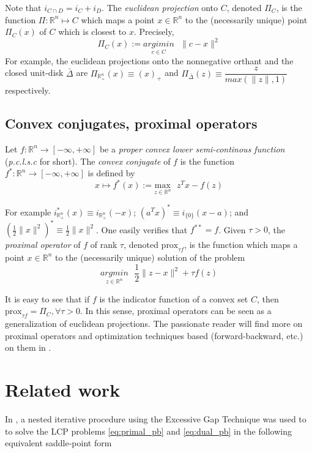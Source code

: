 \documentclass{article} %
\begin{document}
Note that $i_{C \cap D} = i_C + i_D$. The \textit{euclidean projection} onto $C$, denoted $\Pi_C$, is the function
$\Pi: \mathbb{R}^n \mapsto C$ which maps a point $x \in \mathbb{R}^n$ to the (necessarily unique) point $\Pi_C(x)$ of $C$ which is closest to $x$. Precisely,
\begin{equation}
  \Pi_C(x) := \underset{c \in C}{argimin}\text{ }\|c - x\|^2
\end{equation}
For example, the euclidean projections onto the nonnegative orthant and the closed unit-disk $\bar{\Delta}$
are $\Pi_{\mathbb{R}^n_+}(x) \equiv (x)_+$ and $\Pi_{\bar{\Delta}}(z) \equiv \dfrac{z}{max(\|z\|, 1)}$ respectively.

\subsection{Convex conjugates, proximal operators}
Let $f : \mathbb{R}^n \rightarrow [-\infty, +\infty]$ be a \textit{proper convex lower semi-continous function}
(\textit{p.c.l.s.c} for short). The \textit{convex conjugate} of $f$ is the function $f^*: \mathbb{R}^n \rightarrow [-\infty, +\infty]$ is defined by
\begin{equation}
  x \mapsto f^*(x) := \underset{z \in \mathbb{R}^n}{\text{max}}\text{ }z^Tx - f(z)
\end{equation}

For example $i_{\mathbb{R}^{n}_+}^*(x) \equiv i_{\mathbb{R}^{n}_+}(-x)$; $(a^Tx)^* \equiv i_{\{0\}}(x - a)$; and $(\frac{1}{2}\|x\|^2)^* \equiv \frac{1}{2}\|x\|^2$. One easily verifies that $f^{**} = f$. Given $\tau > 0$, the \textit{proximal operator} of $f$ of rank
$\tau$, denoted $\text{prox}_{\tau f}$, is the function which maps a point $x \in \mathbb{R}^n$ to the (necessarily
unique) solution of the problem
\begin{equation}
  \underset{z \in \mathbb{R}^n}{argmin}\text{ }\frac{1}{2}\|z - x\|^2 + \tau f(z)
\end{equation}

It is easy to see that if $f$ is the indicator function of a convex set $C$, then $\text{prox}_{\tau f} = \Pi_C, \forall \tau > 0$. In this sense, proximal operators can be seen
as a generalization of euclidean projections. The passionate reader will find more on proximal operators and optimization techniques based (forward-backward, etc.) on them in \cite{combettes2011proximal}. 


\section{Related work}
In \cite{hoda2010smoothing}, a nested iterative procedure using the Excessive Gap Technique \cite{nesterov2005excessive} was used to to solve the LCP problems \eqref{eq:primal_pb} and \eqref{eq:dual_pb} in the following equivalent saddle-point form
\end{document}
